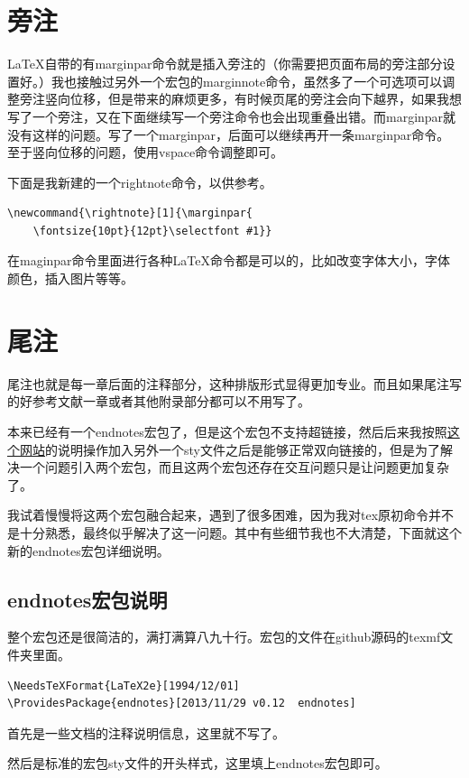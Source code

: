 \documentclass[11pt,oneside]{book}
\begin{document}
\chapter{旁注}
\LaTeX 自带的有marginpar命令就是插入旁注的（你需要把页面布局的旁注部分设置好。）我也接触过另外一个宏包的marginnote命令，虽然多了一个可选项可以调整旁注竖向位移，但是带来的麻烦更多，有时候页尾的旁注会向下越界，如果我想写了一个旁注，又在下面继续写一个旁注命令也会出现重叠出错。而marginpar就没有这样的问题。写了一个marginpar，后面可以继续再开一条marginpar命令。至于竖向位移的问题，使用vspace命令调整即可。

下面是我新建的一个rightnote命令，以供参考。
\begin{Verbatim}
\newcommand{\rightnote}[1]{\marginpar{  
 	\fontsize{10pt}{12pt}\selectfont #1}}
\end{Verbatim}

在maginpar命令里面进行各种\LaTeX 命令都是可以的，比如改变字体大小，字体颜色，插入图片等等。



\chapter{尾注}
尾注也就是每一章后面的注释部分，这种排版形式显得更加专业。而且如果尾注写的好参考文献一章或者其他附录部分都可以不用写了。

本来已经有一个endnotes宏包了，但是这个宏包不支持超链接，然后后来我按照\href{http://tex.stackexchange.com/questions/8452/making-endnotes-clickable-links-with-hyperref}{这个网站}的说明操作加入另外一个sty文件之后是能够正常双向链接的，但是为了解决一个问题引入两个宏包，而且这两个宏包还存在交互问题只是让问题更加复杂了。

我试着慢慢将这两个宏包融合起来，遇到了很多困难，因为我对tex原初命令并不是十分熟悉，最终似乎解决了这一问题。其中有些细节我也不大清楚，下面就这个新的endnotes宏包详细说明。


\section{endnotes宏包说明}
整个宏包还是很简洁的，满打满算八九十行。宏包的文件在github源码的texmf文件夹里面。


\begin{Verbatim}
\NeedsTeXFormat{LaTeX2e}[1994/12/01]
\ProvidesPackage{endnotes}[2013/11/29 v0.12  endnotes]
\end{Verbatim}
首先是一些文档的注释说明信息，这里就不写了。

然后是标准的宏包sty文件的开头样式，这里填上endnotes宏包即可。
\end{document}
